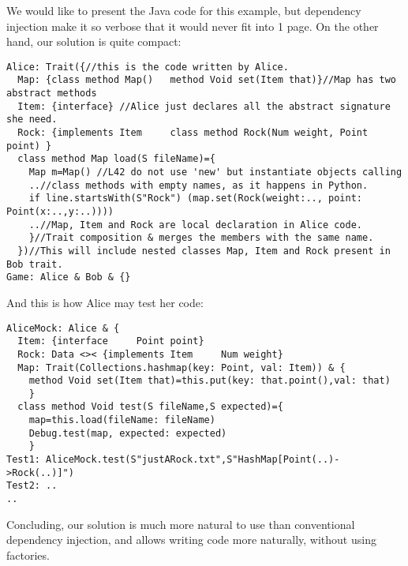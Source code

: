 \documentclass[a4paper,twoside,british,9pt]{extarticle}
\begin{document}
We would like to present the Java code for this example, but
dependency injection make it so verbose that it would
never fit into 1 page. On the other hand, our solution 
is quite compact:
\vspace{-1ex}
\begin{lstlisting}
Alice: Trait({//this is the code written by Alice.
  Map: {class method Map()   method Void set(Item that)}//Map has two abstract methods
  Item: {interface} //Alice just declares all the abstract signature she need.
  Rock: {implements Item     class method Rock(Num weight, Point point) }
  class method Map load(S fileName)={
    Map m=Map() //L42 do not use 'new' but instantiate objects calling
    ..//class methods with empty names, as it happens in Python.
    if line.startsWith(S"Rock") (map.set(Rock(weight:.., point: Point(x:..,y:..))))
    ..//Map, Item and Rock are local declaration in Alice code.
    }//Trait composition & merges the members with the same name.
  })//This will include nested classes Map, Item and Rock present in Bob trait.
Game: Alice & Bob & {}          
\end{lstlisting}

And this is how Alice may test her code:
\begin{lstlisting}
AliceMock: Alice & {
  Item: {interface     Point point}
  Rock: Data <>< {implements Item     Num weight}
  Map: Trait(Collections.hashmap(key: Point, val: Item)) & {
    method Void set(Item that)=this.put(key: that.point(),val: that)
    }
  class method Void test(S fileName,S expected)={
    map=this.load(fileName: fileName)
    Debug.test(map, expected: expected)
    }
Test1: AliceMock.test(S"justARock.txt",S"HashMap[Point(..)->Rock(..)]")
Test2: ..
..
\end{lstlisting}
\vspace{-1ex}
Concluding, our solution is much more natural to use than conventional dependency injection,
and allows writing code more naturally, without using factories.
\end{document}
